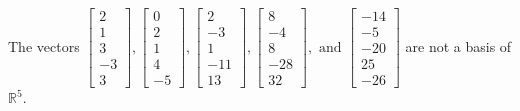 \begin{exercise}
\begin{exerciseStatement}
  \end{exerciseStatement}
  \begin{exerciseAnswer}
   The vectors \(\left[\begin{array}{r}
2 \\
1 \\
3 \\
-3 \\
3
\end{array}\right] , \left[\begin{array}{r}
0 \\
2 \\
1 \\
4 \\
-5
\end{array}\right] , \left[\begin{array}{r}
2 \\
-3 \\
1 \\
-11 \\
13
\end{array}\right] , \left[\begin{array}{r}
8 \\
-4 \\
8 \\
-28 \\
32
\end{array}\right] , \text{ and } \left[\begin{array}{r}
-14 \\
-5 \\
-20 \\
25 \\
-26
\end{array}\right]\) 
  	 are not  a basis of \(\mathbb{R}^5\).
  


  \end{exerciseAnswer}
\end{exercise}